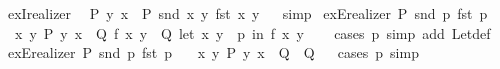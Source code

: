 \begin{isabellebody}
%
\endisadelimproof
\isanewline
{}\isamarkupfalse%
\ exI{\isacharunderscore}{\kern0pt}realizer{\isacharcolon}{\kern0pt}\isanewline
\ \ {\isachardoublequoteopen}P\ y\ x\ {\isasymLongrightarrow}\ P\ {\isacharparenleft}{\kern0pt}snd\ {\isacharparenleft}{\kern0pt}x{\isacharcomma}{\kern0pt}\ y{\isacharparenright}{\kern0pt}{\isacharparenright}{\kern0pt}\ {\isacharparenleft}{\kern0pt}fst\ {\isacharparenleft}{\kern0pt}x{\isacharcomma}{\kern0pt}\ y{\isacharparenright}{\kern0pt}{\isacharparenright}{\kern0pt}{\isachardoublequoteclose}%
\isadelimproof
\ %
\endisadelimproof
%
\isatagproof
{}\isamarkupfalse%
\ simp%
\endisatagproof
{\isafoldproof}%
%
\isadelimproof
%
\endisadelimproof
\isanewline
\isanewline
{}\isamarkupfalse%
\ exE{\isacharunderscore}{\kern0pt}realizer{\isacharcolon}{\kern0pt}\ {\isachardoublequoteopen}P\ {\isacharparenleft}{\kern0pt}snd\ p{\isacharparenright}{\kern0pt}\ {\isacharparenleft}{\kern0pt}fst\ p{\isacharparenright}{\kern0pt}\ {\isasymLongrightarrow}\isanewline
\ \ {\isacharparenleft}{\kern0pt}{\isasymAnd}x\ y{\isachardot}{\kern0pt}\ P\ y\ x\ {\isasymLongrightarrow}\ Q\ {\isacharparenleft}{\kern0pt}f\ x\ y{\isacharparenright}{\kern0pt}{\isacharparenright}{\kern0pt}\ {\isasymLongrightarrow}\ Q\ {\isacharparenleft}{\kern0pt}let\ {\isacharparenleft}{\kern0pt}x{\isacharcomma}{\kern0pt}\ y{\isacharparenright}{\kern0pt}\ {\isacharequal}{\kern0pt}\ p\ in\ f\ x\ y{\isacharparenright}{\kern0pt}{\isachardoublequoteclose}\isanewline
%
\isadelimproof
\ \ %
\endisadelimproof
%
\isatagproof
{}\isamarkupfalse%
\ {\isacharparenleft}{\kern0pt}cases\ p{\isacharparenright}{\kern0pt}\ {\isacharparenleft}{\kern0pt}simp\ add{\isacharcolon}{\kern0pt}\ Let{\isacharunderscore}{\kern0pt}def{\isacharparenright}{\kern0pt}%
\endisatagproof
{\isafoldproof}%
%
\isadelimproof
\isanewline
%
\endisadelimproof
\isanewline
{}\isamarkupfalse%
\ exE{\isacharunderscore}{\kern0pt}realizer{\isacharprime}{\kern0pt}{\isacharcolon}{\kern0pt}\ {\isachardoublequoteopen}P\ {\isacharparenleft}{\kern0pt}snd\ p{\isacharparenright}{\kern0pt}\ {\isacharparenleft}{\kern0pt}fst\ p{\isacharparenright}{\kern0pt}\ {\isasymLongrightarrow}\isanewline
\ \ {\isacharparenleft}{\kern0pt}{\isasymAnd}x\ y{\isachardot}{\kern0pt}\ P\ y\ x\ {\isasymLongrightarrow}\ Q{\isacharparenright}{\kern0pt}\ {\isasymLongrightarrow}\ Q{\isachardoublequoteclose}%
\isadelimproof
\ %
\endisadelimproof
%
\isatagproof
{}\isamarkupfalse%
\ {\isacharparenleft}{\kern0pt}cases\ p{\isacharparenright}{\kern0pt}\ simp%
\endisatagproof
{\isafoldproof}%

\end{isabellebody}
